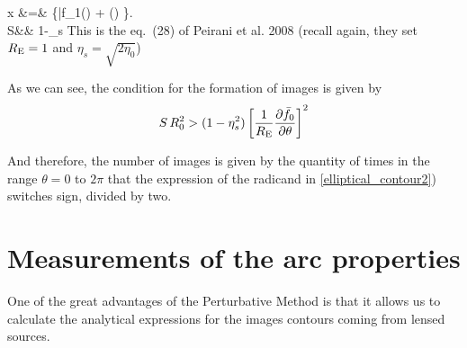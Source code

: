 \bea
\label{eq:ellipsource}
x &=&  \left\{\bar{f}_{1}(\theta) +%
\left(\right) \pm {}  \right\}.\label{elliptical_contour2}\\
S&\equiv& 1-\eta_s\cos{(2\tilde{\te})}\nonumber
\eea
This is the eq.~(28) of Peirani et al. 2008 (recall again, they set $R_{\mathrm{E}}=1$ and
$\eta_s=\sqrt{2\eta_0}$)


As we can see, the condition for the formation of images is given by
\begin{equation*}
S\,R^2_0>(1-\eta^2_s)\left[\frac{1}{R_{\mathrm{E}}}\dfrac{\partial \bar{f}_0}{\partial
\theta}\right]^2
\end{equation*}

And therefore, the number of images is given by the quantity of times
in the range $\theta = 0 $ to $2 \pi$ that the expression of the
radicand in \eqref{elliptical_contour2}) switches sign, divided by
two.


\section{Measurements of the arc properties}

One of the great advantages of the Perturbative Method is that it
allows us to calculate the analytical expressions for the images contours
coming from lensed sources.

